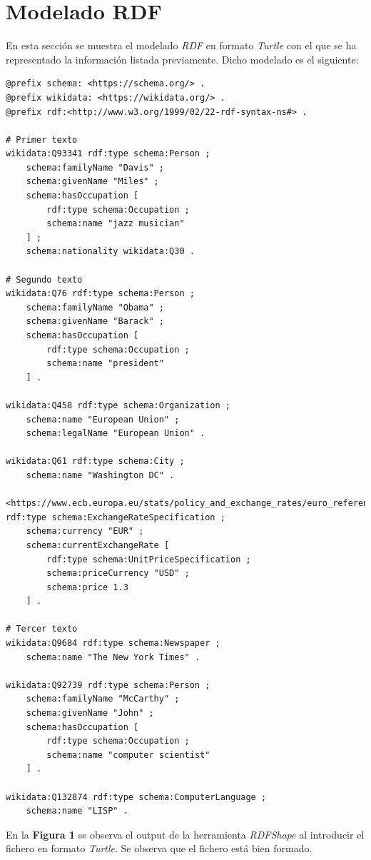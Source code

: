 \documentclass[11pt]{article}
\begin{document}
\section{Modelado RDF}
En esta sección se muestra el modelado \textit{RDF} en formato \textit{Turtle} con el que se ha representado la información listada previamente. Dicho modelado es el siguiente:

\begin{lstlisting}
@prefix schema: <https://schema.org/> .
@prefix wikidata: <https://wikidata.org/> .
@prefix rdf:<http://www.w3.org/1999/02/22-rdf-syntax-ns#> .

# Primer texto
wikidata:Q93341 rdf:type schema:Person ;
    schema:familyName "Davis" ;
    schema:givenName "Miles" ;
    schema:hasOccupation [
        rdf:type schema:Occupation ;
        schema:name "jazz musician"
    ] ;
    schema:nationality wikidata:Q30 .

# Segundo texto
wikidata:Q76 rdf:type schema:Person ;
    schema:familyName "Obama" ;
    schema:givenName "Barack" ;
    schema:hasOccupation [
        rdf:type schema:Occupation ;
        schema:name "president"
    ] .

wikidata:Q458 rdf:type schema:Organization ;
    schema:name "European Union" ;
    schema:legalName "European Union" .

wikidata:Q61 rdf:type schema:City ;
    schema:name "Washington DC" .

<https://www.ecb.europa.eu/stats/policy_and_exchange_rates/euro_reference_exchange_rates/html/index.en.html> rdf:type schema:ExchangeRateSpecification ;
    schema:currency "EUR" ;
    schema:currentExchangeRate [
        rdf:type schema:UnitPriceSpecification ;
        schema:priceCurrency "USD" ;
        schema:price 1.3
    ] .

# Tercer texto
wikidata:Q9684 rdf:type schema:Newspaper ;
    schema:name "The New York Times" .

wikidata:Q92739 rdf:type schema:Person ;
    schema:familyName "McCarthy" ;
    schema:givenName "John" ;
    schema:hasOccupation [
        rdf:type schema:Occupation ;
        schema:name "computer scientist"
    ] .

wikidata:Q132874 rdf:type schema:ComputerLanguage ;
    schema:name "LISP" .
\end{lstlisting}

En la \textbf{Figura 1} se observa el output de la herramienta \textit{RDFShape} al introducir el fichero en formato \textit{Turtle}. Se observa que el fichero está bien formado.
\end{document}
